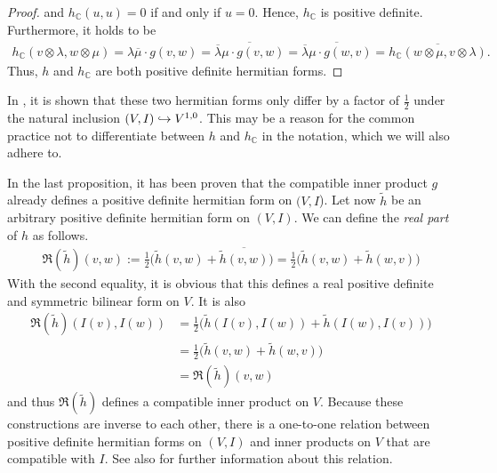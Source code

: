 \begin{proof}
	and $h_\mathbb{C}(u,u) = 0$ if and only if $u = 0$. Hence, $h_\mathbb{C}$ is positive definite.
	Furthermore, it holds to be
	\begin{align*}
		h_\mathbb{C}(v \otimes \lambda,w \otimes \mu) = \lambda \overline{\mu} \cdot  g(v,w) = \overline
		{\overline \lambda \mu \cdot g(v,w)} = 	\overline{\overline \lambda \mu \cdot g(w,v)} =
		\overline{h_\mathbb{C} (w \otimes \mu, v \otimes \lambda)}.
	\end{align*}
	Thus, $h$ and $h_\mathbb{C}$ are both positive definite hermitian forms.
\end{proof}

\begin{nota} In \cite[Lemma 1.2.17]{Huybrechts2004}, it is shown that these two hermitian forms only
	differ by a factor of $\frac{1}{2}$ under the natural inclusion $(V,I) \hookrightarrow V^{1,0}$. This may be a
	reason for the common practice not to differentiate between $h$ and $h_\mathbb{C}$ in the notation,
	which we will also adhere to.
\end{nota}
\begin{rem}
	\label{loc-theory:rem:real-of-hermitian-form}
	In the last proposition, it has been proven that the compatible inner product $g$ already defines a
	positive definite hermitian form on $(V,I$). Let now $\tilde h$ be an arbitrary positive definite hermitian 
	form on $(V,I)$. We can define the \emph{real part} of $h$ as follows.
	\begin{align*}
		\Re(\tilde h)(v,w) := \frac{1}{2} \big(\tilde h(v,w) + \overline{\tilde h(v,w)}\big) =
		\frac{1}{2}\big(\tilde h(v,w) + \tilde h(w,v)\big)
	\end{align*}
	With the second equality, it is obvious that this defines a real positive definite and symmetric
	bilinear form on $V$. It is also
	\begin{align*}
		\Re(\tilde h)(I(v),I(w)) &= \frac{1}{2} \big(\tilde h(I(v),I(w)) + \tilde h(I(w),I(v))\big)\\&=
		\frac{1}{2} \big(\tilde h(v,w) + \tilde h(w,v)\big) \\&= \Re(\tilde h)(v,w)
	\end{align*}
	and thus $\Re(\tilde h)$ defines a compatible inner product on $V$. Because these constructions are
	inverse to each other, there is a one-to-one relation between positive definite hermitian forms on
	$(V,I)$ and inner products on $V$ that are compatible with $I$. See also 
	\cite[Section. 3.1.1]{Voisin2002} for further information about this relation.
\end{rem}

